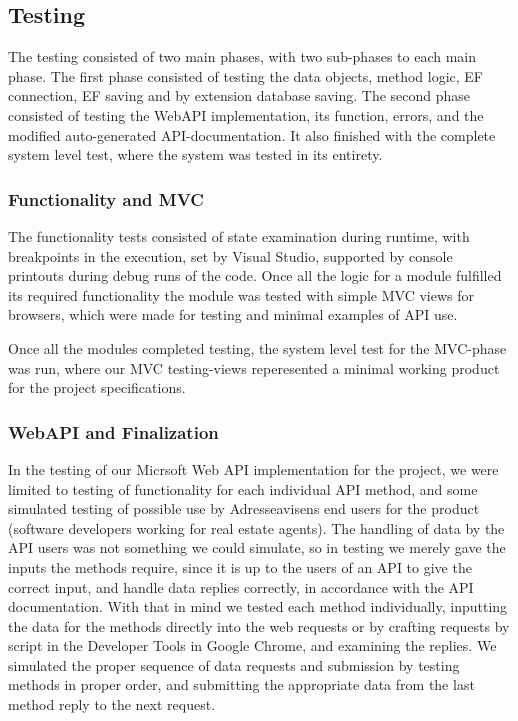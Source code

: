 \subsection{Testing}

The testing consisted of two main phases, with two sub-phases to each main phase. The first phase consisted of testing the data objects, method logic, EF connection,
EF saving and by extension database saving.
The second phase consisted of testing the WebAPI implementation, its function, errors, and the modified auto-generated API-documentation. It also finished with the
complete system level test, where the system was tested in its entirety.

\subsubsection{Functionality and MVC}

The functionality tests consisted of state examination during runtime, with breakpoints in the execution, set by Visual Studio, supported by console printouts
during debug runs of the code. Once all the logic for a module fulfilled its required functionality the module was tested with simple MVC views for browsers, 
which were made for testing and minimal examples of API use.

Once all the modules completed testing, the system level test for the MVC-phase was run, where our MVC testing-views reperesented a minimal working product for
the project specifications.

\subsubsection{WebAPI and Finalization}

In the testing of our Micrsoft Web API implementation for the project, we were limited to testing of functionality for each individual API method, and
some simulated testing of possible use by Adresseavisens end users for the product (software developers working for real estate agents).
The handling of data by the API users was not something we could simulate, so in testing we merely gave the inputs the methods require, since it is up to
the users of an API to give the correct input, and handle data replies correctly, in accordance with the API documentation.
With that in mind we tested each method individually, inputting the data for the methods directly into the web requests or by crafting requests by script in
the Developer Tools in Google Chrome, and examining the replies. 
We simulated the proper sequence of data requests and submission by testing methods in proper order, and submitting the appropriate data from the last method reply
to the next request.

